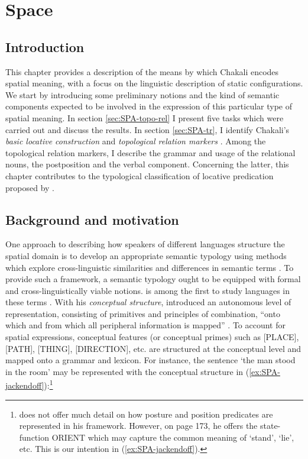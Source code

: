 

\chapter{Space}
\label{sec:SPA-chap}

\section{Introduction}
\label{sec:SPA-intro}

This chapter provides a description of the means by which Chakali encodes
spatial meaning,  with a focus on the linguistic description of static
configurations. We start by introducing some preliminary notions and the kind of
semantic components expected to be involved in the expression of this particular
type of spatial meaning. In section \ref{sec:SPA-topo-rel} I present  five
tasks which were carried out and discuss the results.  In section
\ref{sec:SPA-tr}, I
identify  Chakali's  {\it  basic locative construction} and {\it  topological
relation markers} \citep{Levi06}. Among the  topological relation markers, I
describe the grammar and usage of the relational nouns, the postposition and the
verbal component. Concerning the latter, this chapter contributes to the
typological
classification of locative predication  proposed by \cite{Amek07b}.  


\section{Background and motivation}
\label{sec:SPA-back-mot}
 
One approach to  describing how speakers of different languages
structure the spatial domain is to develop an appropriate semantic typology
using methods which explore cross-linguistic similarities and differences in
semantic terms \citep[513]{Levi06}. To provide such a framework, a semantic
typology ought to be equipped with   formal and cross-linguistically viable
notions. \cite{Jack83} is among the first to study languages in these
terms \cite[see also][]{Talm83, Hers86, Lako87, Vand91}. With his {\it
conceptual structure}, \citeauthor{Jack83} introduced an autonomous level of
representation, consisting of  primitives and principles of combination, ``onto
which and from which all peripheral information is mapped'' \citep[19]{Jack83}.
To account for spatial expressions, conceptual features (or conceptual primes)
such as [PLACE], [PATH], [THING], [DIRECTION], etc.  are structured at the
conceptual level and mapped onto a grammar and lexicon.  For instance, the
sentence  `the man stood in the room' may be represented with the conceptual
structure in (\ref{ex:SPA-jackendoff}):\footnote{\cite{Jack83} does not offer
much detail on how  posture and position predicates are represented in his
framework. However, on page 173, he offers the state-function ORIENT which may
capture the common meaning  of `stand', `lie', etc. This is our intention in
(\ref{ex:SPA-jackendoff}).}

